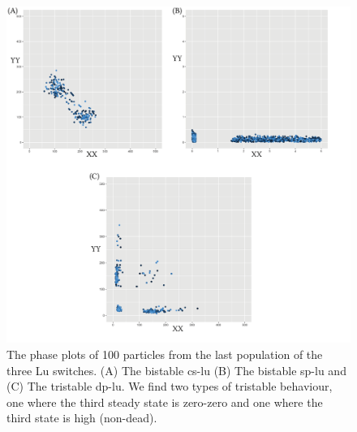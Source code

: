 \begin{figure}[p]
\begin{center}
\includegraphics[width=\textwidth]{../../chapters/chapterStabilityFinder/images/lu_paper_phase.png}
\caption[Resulting phase plots from StabilityFinder used on the Lu switches ]{ \label{fig:lu_paper_phase}The phase plots of 100 particles from the last population of the three Lu switches. (A) The bistable \acrshort{cs-lu} (B) The bistable \acrshort{sp-lu} and (C) The tristable \acrshort{dp-lu}. We find two types of tristable behaviour, one where the third steady state is zero-zero and one where the third state is high (non-dead). }
\end{center}
\end{figure}
\clearpage

